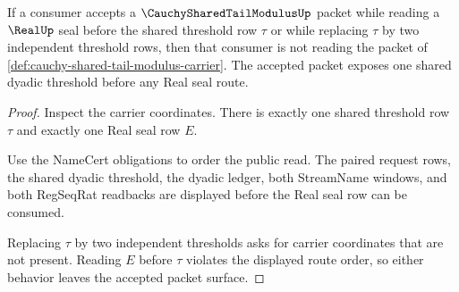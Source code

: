 \begin{theorem}
\label{thm:cauchy-shared-tail-modulus-falsifiable-prediction}
If a consumer accepts a $\CauchySharedTailModulusUp$ packet while reading a $\RealUp$ seal before the shared threshold row $\tau$ or while replacing $\tau$ by two independent threshold rows, then that consumer is not reading the packet of \autoref{def:cauchy-shared-tail-modulus-carrier}. The accepted packet exposes one shared dyadic threshold before any Real seal route.
\end{theorem}
\begin{proof}
Inspect the carrier coordinates. There is exactly one shared threshold row $\tau$ and exactly one Real seal row $E$.

Use the NameCert obligations to order the public read. The paired request rows, the shared dyadic threshold, the dyadic ledger, both StreamName windows, and both RegSeqRat readbacks are displayed before the Real seal row can be consumed.

Replacing $\tau$ by two independent thresholds asks for carrier coordinates that are not present. Reading $E$ before $\tau$ violates the displayed route order, so either behavior leaves the accepted packet surface.
\end{proof}




